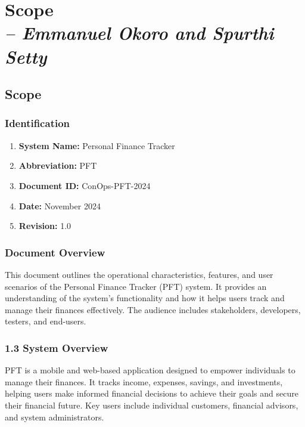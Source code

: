 \chapter{Scope \\
\small{\textit{-- Emmanuel Okoro and Spurthi Setty}}
\label{Chapter::Scope}}

\section{Scope}
\subsection{Identification}
\begin{enumerate}
    \item \textbf{System Name:} Personal Finance Tracker
    \item \textbf{Abbreviation:} PFT
    \item \textbf{Document ID:} ConOps-PFT-2024
    \item \textbf{Date:} November 2024
    \item \textbf{Revision:} 1.0
\end{enumerate}

\subsection{Document Overview}
This document outlines the operational characteristics, features, and user scenarios of the Personal Finance Tracker (PFT) system. It provides an understanding of the system’s functionality and how it helps users track and manage their finances effectively. The audience includes stakeholders, developers, testers, and end-users.

\subsection{1.3 System Overview}
 PFT is a mobile and web-based application designed to empower individuals to manage their finances. It tracks income, expenses, savings, and investments, helping users make informed financial decisions to achieve their goals and secure their financial future. Key users include individual customers, financial advisors, and system administrators.